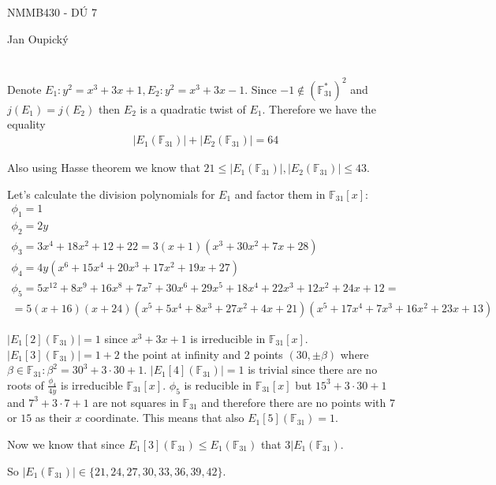 \documentclass[12pt, a4paper]{article}
\begin{document}
\begin{center}
\large NMMB430 - DÚ 7

\normalsize Jan Oupický
\end{center}
\vspace{1\baselineskip}

\section{}
Denote $E_1: y^2=x^3+3x+1, E_2: y^2=x^3+3x-1$. Since $-1 \notin (\mathbb{F}_{31}^*)^2$ and $j(E_1)=j(E_2)$ then $E_2$ is a quadratic twist of $E_1$. Therefore we have the equality
\begin{gather*}
|E_1(\mathbb{F}_{31})|+|E_2(\mathbb{F}_{31})|=64
\end{gather*}

Also using Hasse theorem we know that $21 \leq |E_1(\mathbb{F}_{31})|,|E_2(\mathbb{F}_{31})| \leq 43$.

Let's calculate the division polynomials for $E_1$ and factor them in $\mathbb{F}_{31}[x]$:
\begin{gather*}
\phi_1= 1\\
\phi_2 = 2y\\
\phi_3 = 3x^4+18x^2+12+22 = 3(x+1)(x^3+30x^2+7x+28)\\
\phi_4 = 4y(x^6+15x^4+20x^3+17x^2+19x+27)\\
\phi_5 = 5x^{12}+8x^9+16x^8+7x^7+30x^6+29x^5+18x^4+22x^3+12x^2+24x+12 = \\
=5(x+16)(x+24)(x^5+5x^4+8x^3+27x^2+4x+21)(x^5+17x^4+7x^3+16x^2+23x+13)
\end{gather*}

$|E_1[2](\mathbb{F}_{31})|=1$ since $x^3+3x+1$ is irreducible in $\mathbb{F}_{31}[x]$. $|E_1[3](\mathbb{F}_{31})|=1+2$ the point at infinity and 2 points $(30,\pm \beta)$ where $\beta \in \mathbb{F}_{31}:\beta^2=30^3+3\cdot30+1$. $|E_1[4](\mathbb{F}_{31})|=1$ is trivial since there are no roots of $\frac{\phi_4}{4y}$ is irreducible $\mathbb{F}_{31}[x]$. $\phi_5$ is reducible in $\mathbb{F}_{31}[x]$ but $15^3+3\cdot30+1$ and $7^3+3\cdot7+1$ are not squares in $\mathbb{F}_{31}$ and therefore there are no points with $7$ or $15$ as their $x$ coordinate. This means that also $E_1[5](\mathbb{F}_{31})=1$.

Now we know that since $E_1[3](\mathbb{F}_{31}) \leq E_1(\mathbb{F}_{31})$ that $3|E_1(\mathbb{F}_{31})$. 

So $|E_1(\mathbb{F}_{31})| \in \{21, 24, 27, 30, 33, 36, 39, 42\}$.
\end{document}
